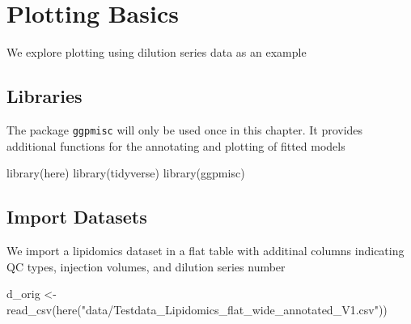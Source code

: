 \documentclass[
  letterpaper,
  DIV=11,
  numbers=noendperiod]{scrreprt}
\newenvironment{Shaded}{\begin{snugshade}}{\end{snugshade}}
\newcommand{\FunctionTok}[1]{\textcolor[rgb]{0.28,0.35,0.67}{#1}}
\newcommand{\NormalTok}[1]{\textcolor[rgb]{0.00,0.23,0.31}{#1}}
\newcommand{\OtherTok}[1]{\textcolor[rgb]{0.00,0.23,0.31}{#1}}
\newcommand{\StringTok}[1]{\textcolor[rgb]{0.13,0.47,0.30}{#1}}
\begin{document}
\hypertarget{plotting-basics}{%
\chapter{Plotting Basics}\label{plotting-basics}}

We explore plotting using dilution series data as an example

\hypertarget{libraries}{%
\section{Libraries}\label{libraries}}

The package \texttt{ggpmisc} will only be used once in this chapter. It
provides additional functions for the annotating and plotting of fitted
models

\begin{Shaded}
\begin{Highlighting}[]
\FunctionTok{library}\NormalTok{(here)}
\FunctionTok{library}\NormalTok{(tidyverse)}
\FunctionTok{library}\NormalTok{(ggpmisc)}
\end{Highlighting}
\end{Shaded}

\hypertarget{import-datasets}{%
\section{Import Datasets}\label{import-datasets}}

We import a lipidomics dataset in a flat table with additinal columns
indicating QC types, injection volumes, and dilution series number

\begin{Shaded}
\begin{Highlighting}[]
\NormalTok{d\_orig }\OtherTok{\textless{}{-}} \FunctionTok{read\_csv}\NormalTok{(}\FunctionTok{here}\NormalTok{(}\StringTok{"data/Testdata\_Lipidomics\_flat\_wide\_annotated\_V1.csv"}\NormalTok{))}
\end{Highlighting}
\end{Shaded}
\end{document}
